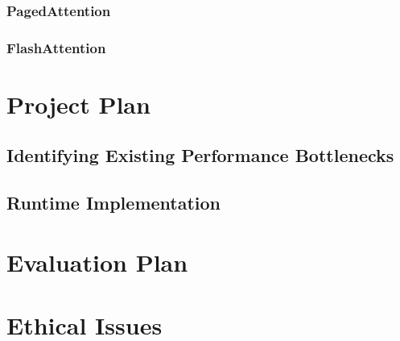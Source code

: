 \documentclass[12pt,twoside]{report}
\begin{document}
\subsection{PagedAttention}
\subsection{FlashAttention}


\chapter{Project Plan} %
\section{Identifying Existing Performance Bottlenecks}

\section{Runtime Implementation}

\chapter{Evaluation Plan} %


\chapter{Ethical Issues} %



\end{document}
